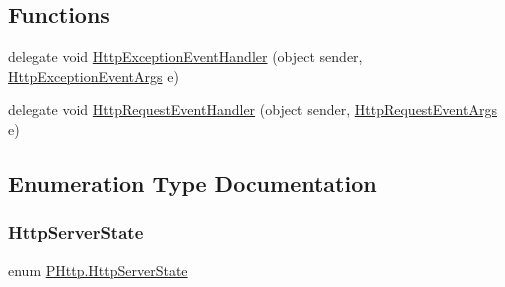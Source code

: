 \subsection*{Functions}
\begin{DoxyCompactItemize}
\item 
delegate void \hyperlink{namespace_p_http_a3004f4a8bbd5aaf98c00d1771384224f}{Http\+Exception\+Event\+Handler} (object sender, \hyperlink{class_p_http_1_1_http_exception_event_args}{Http\+Exception\+Event\+Args} e)
\item 
delegate void \hyperlink{namespace_p_http_a746b16e27637dd7ea95bb9256e7a93ff}{Http\+Request\+Event\+Handler} (object sender, \hyperlink{class_p_http_1_1_http_request_event_args}{Http\+Request\+Event\+Args} e)
\end{DoxyCompactItemize}


\subsection{Enumeration Type Documentation}
\mbox{\label{namespace_p_http_a8a92bffd93830785b58d0be3a2f5fdd4}} 
\subsubsection{\texorpdfstring{Http\+Server\+State}{HttpServerState}}
{\footnotesize\ttfamily enum \hyperlink{namespace_p_http_a8a92bffd93830785b58d0be3a2f5fdd4}{P\+Http.\+Http\+Server\+State}\hspace{0.3cm}{\ttfamily [strong]}}

